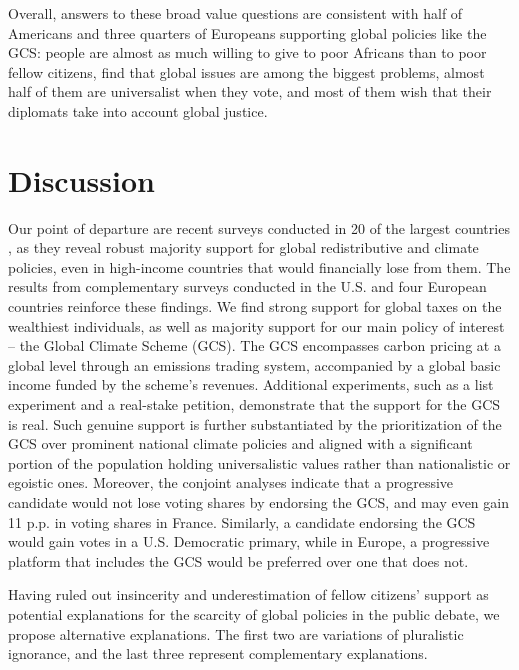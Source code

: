 Overall, answers to these broad value questions are consistent with half of Americans and three quarters of Europeans supporting global policies like the GCS: people are almost as much willing to give to poor Africans than to poor fellow citizens, find that global issues are among the biggest problems, almost half of them are universalist when they vote, and most of them wish that their diplomats take into account global justice.

\section{Discussion} %
Our point of departure are recent surveys conducted %
in 20 of the largest countries%
, as they reveal robust majority support for global redistributive and climate policies, even in high-income countries that would financially lose from them. The results from complementary surveys conducted in the U.S. and four European countries %
reinforce these findings. We find strong support for global taxes on the wealthiest individuals, as well as majority support for our main policy of interest -- the Global Climate Scheme (GCS). The GCS encompasses carbon pricing at a global level through an emissions trading system, accompanied by a global basic income funded by the scheme's revenues. Additional experiments, such as a list experiment and a real-stake petition, demonstrate that the support for the GCS is real. 
Such genuine support is further substantiated by the prioritization of the GCS over prominent national climate policies and aligned with a significant portion of the population holding universalistic values rather than nationalistic or egoistic ones. Moreover, the conjoint analyses indicate that a progressive candidate would not lose voting shares by endorsing the GCS, and may even gain 11 p.p. in voting shares in France. Similarly, a candidate endorsing the GCS would gain votes in a U.S. Democratic primary, while in Europe, a progressive platform that includes the GCS would be preferred over one that does not.

Having ruled out insincerity and underestimation of fellow citizens' support as potential explanations for the scarcity of global policies in the public debate, we propose alternative explanations. %
The first two are variations of pluralistic ignorance, and the last three represent complementary explanations. 

